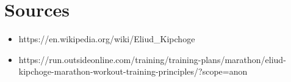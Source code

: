 \documentclass[letterpaper]{article}
\def\tightlist{}
\begin{document}
\section{Sources}\label{sources}

\begin{itemize}
\tightlist
\item
  https://en.wikipedia.org/wiki/Eliud\_Kipchoge
\item
  https://run.outsideonline.com/training/training-plans/marathon/eliud-kipchoge-marathon-workout-training-principles/?scope=anon
\end{itemize}
\end{document}
